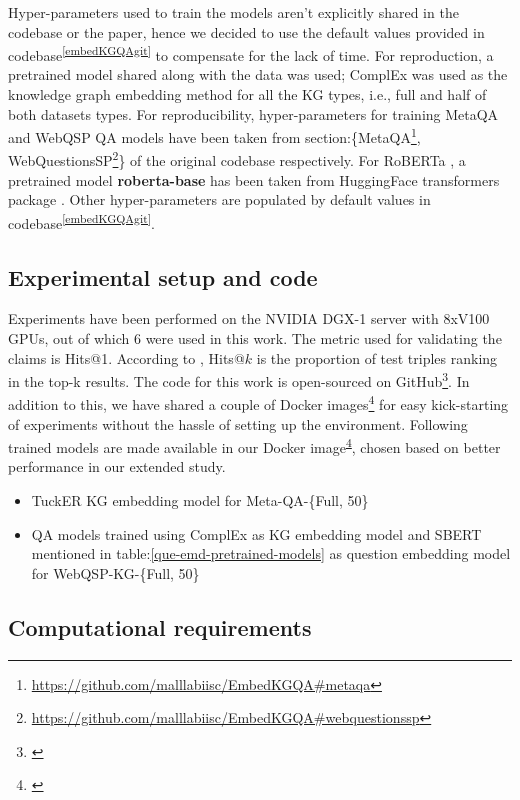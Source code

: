 Hyper-parameters used to train the models aren't explicitly shared in the codebase or the paper, hence we decided to use the default values provided in codebase\textsuperscript{\ref{embedKGQAgit}} to compensate for the lack of time. For reproduction, a pretrained model shared along with the data was used; ComplEx\cite{ComplEx2016} was used as the knowledge graph embedding method for all the KG types, i.e., full and half of both datasets types. For reproducibility, hyper-parameters for training MetaQA and WebQSP QA models have been taken from section:\{MetaQA\footnote{\url{https://github.com/malllabiisc/EmbedKGQA\#metaqa}}, WebQuestionsSP\footnote{\url{https://github.com/malllabiisc/EmbedKGQA\#webquestionssp}}\} of the original codebase respectively. For RoBERTa \cite{roberta}, a pretrained model \textbf{roberta-base} has been taken from HuggingFace transformers package \cite{huggingface-transformers-package-2020}. Other hyper-parameters are populated by default values in codebase\textsuperscript{\ref{embedKGQAgit}}.

\subsection{Experimental setup and code}
Experiments have been performed on the NVIDIA DGX-1 server with 8xV100 GPUs, out of which 6 were used in this work. The metric used for validating the claims is Hits@1. According to \cite{kg-embedding-evaluation}, Hits@$k$ is the proportion of test triples ranking in the top-k results. The code for this work is open-sourced on GitHub\footnote{\mlrcgit\label{mlrcgitlink}}. In addition to this, we have shared a couple of Docker images\footnote{\label{mlrcdocker}\mlrcdocker} for easy kick-starting of experiments without the hassle of setting up the environment. Following trained models are made available in our Docker image\textsuperscript{\ref{mlrcdocker}}, chosen based on better performance in our extended study.

\begin{itemize}
    \item TuckER KG embedding model for Meta-QA-\{Full, 50\}
    \item QA models trained using ComplEx as KG embedding model and SBERT mentioned in table:\ref{que-emd-pretrained-models} as question embedding model for WebQSP-KG-\{Full, 50\}
\end{itemize}




\subsection{Computational requirements}

